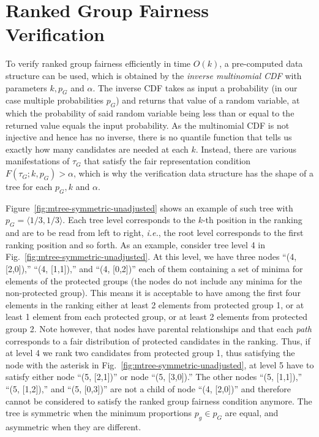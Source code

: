 
\section{Ranked Group Fairness Verification}
\label{sec:fairness-verification}
To verify ranked group fairness efficiently in time $O(k)$, a pre-computed data structure can be used, which is obtained by the \emph{inverse multinomial CDF} with parameters $k, p_G$ and $ \alpha $.
%
The inverse CDF takes as input a probability (in our case multiple probabilities $p_G$) and returns that value of a random variable, at which the probability of said random variable being less than or equal to the returned value equals the input probability.
%
As the multinomial CDF is not injective and hence has no inverse, there is no quantile function that tells us exactly how many candidates are needed at each $ k $.
%
Instead, there are various manifestations of $ \tau_G $ that satisfy the fair representation condition $F(\tau_G;k,p_G) > \alpha$, which is why the verification data structure has the shape of a tree for each $ p_G, k $ and $ \alpha $.
%

Figure~\ref{fig:mtree-symmetric-unadjusted} shows an example of such tree with $p_G = \langle 1/3, 1/3 \rangle$.
%
Each tree level corresponds to the $k$-th position in the ranking and are to be read from left to right, {\it i.e.}, the root level corresponds to the first ranking position and so forth.
%
As an example, consider tree level 4 in Fig.~\ref{fig:mtree-symmetric-unadjusted}.
%
At this level, we have three nodes ``(4, [2,0]),'' ``(4, [1,1]),'' and ``(4, [0,2])'' each of them containing a set of minima for elements of the protected groups (the nodes do not include any minima for the non-protected group).
%
This means it is acceptable to have among the first four elements in the ranking either at least 2 elements from protected group 1, or at least 1 element from each protected group, or at least 2 elements from protected group 2.
%
Note however, that nodes have parental relationships and that each \emph{path} corresponds to a fair distribution of protected candidates in the ranking.
%
Thus, if at level 4 we rank two candidates from protected group 1, thus satisfying the node with the asterisk in Fig.~\ref{fig:mtree-symmetric-unadjusted}, at level 5 have to satisfy either node ``(5, [2,1])'' or node ``(5, [3,0]).''
%
The other nodes ``(5, [1,1]),'' ``(5, [1,2]),'' and ``(5, [0,3])'' are not a child of node ``(4, [2,0])'' and therefore cannot be considered to satisfy the ranked group fairness condition anymore.
%
The tree is symmetric when the minimum proportions $p_g \in p_G$ are equal, and asymmetric when they are different.
%
%

